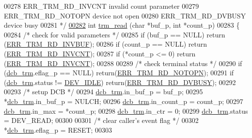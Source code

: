 \begin{DoxyCode}
00278 \textcolor{comment}{                ERR\_TRM\_RD\_INVCNT invalid count parameter}
00279 \textcolor{comment}{                ERR\_TRM\_RD\_NOTOPN device not open}
00280 \textcolor{comment}{                ERR\_TRM\_RD\_DVBUSY device busy}
00281 \textcolor{comment}{*/}
\hypertarget{trmdrive_8c_source_l00282}{}\hyperlink{trmdrive_8h_a3de0bf4ec770b397e43b734abd993ce3}{00282} \textcolor{keywordtype}{int} \hyperlink{trmdrive_8c_a3de0bf4ec770b397e43b734abd993ce3}{trm_read} (\textcolor{keywordtype}{char} *buf\_p, \textcolor{keywordtype}{int} *count\_p)
00283 \{
00284         \textcolor{comment}{/* check for valid parameters */}
00285         \textcolor{keywordflow}{if} (buf\_p == NULL) \textcolor{keywordflow}{return} (\hyperlink{trmdrive_8h_abe5aa098b0bfd36bdd58d3144c6b744c}{ERR_TRM_RD_INVBUF});
00286         \textcolor{keywordflow}{if} (count\_p == NULL) \textcolor{keywordflow}{return} (\hyperlink{trmdrive_8h_a5ec87cfe72b9788e814e4e990215e996}{ERR_TRM_RD_INVCNT});
00287         \textcolor{keywordflow}{if} (*count\_p <= 0) \textcolor{keywordflow}{return} (\hyperlink{trmdrive_8h_a5ec87cfe72b9788e814e4e990215e996}{ERR_TRM_RD_INVCNT});
00288 
00289         \textcolor{comment}{/* check terminal status */}
00290         \textcolor{keywordflow}{if} (\hyperlink{trmdrive_8c_aeecf5b41137f812666e981eebea04e61}{dcb_trm}.eflag\_p == NULL) \textcolor{keywordflow}{return}(\hyperlink{trmdrive_8h_acd7f66a8b5804b680e88c57fdb9f5c8b}{ERR_TRM_RD_NOTOPN});
00291         \textcolor{keywordflow}{if} (\hyperlink{trmdrive_8c_aeecf5b41137f812666e981eebea04e61}{dcb_trm}.status != \hyperlink{trmdrive_8c_a6f821c66a608d5628538df4c12dcf4b9}{DEV_IDLE}) \textcolor{keywordflow}{return}(\hyperlink{trmdrive_8h_ae21f21acb228f04036e1f98920cd81f1}{ERR_TRM_RD_DVBUSY});
00292 
00293         \textcolor{comment}{/* setup DCB */}
00294         \hyperlink{trmdrive_8c_aeecf5b41137f812666e981eebea04e61}{dcb_trm}.in\_buf\_p = buf\_p;
00295         *\hyperlink{trmdrive_8c_aeecf5b41137f812666e981eebea04e61}{dcb_trm}.in\_buf\_p = NULCH;
00296         \hyperlink{trmdrive_8c_aeecf5b41137f812666e981eebea04e61}{dcb_trm}.in\_count\_p = count\_p;
00297         \hyperlink{trmdrive_8c_aeecf5b41137f812666e981eebea04e61}{dcb_trm}.in\_max = *count\_p;
00298         \hyperlink{trmdrive_8c_aeecf5b41137f812666e981eebea04e61}{dcb_trm}.in\_ctr = 0;
00299         \hyperlink{trmdrive_8c_aeecf5b41137f812666e981eebea04e61}{dcb_trm}.status = DEV\_READ;
00300 
00301         \textcolor{comment}{/* clear caller's event flag */}
00302         *\hyperlink{trmdrive_8c_aeecf5b41137f812666e981eebea04e61}{dcb_trm}.eflag\_p = RESET;
00303 

\end{DoxyCode}
